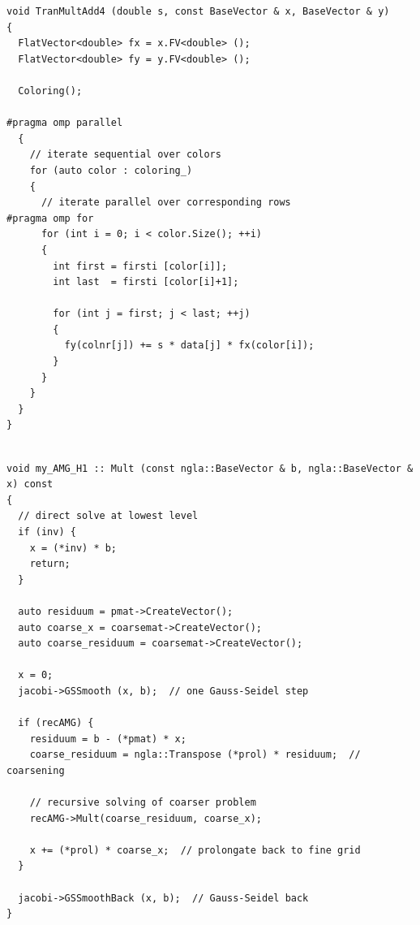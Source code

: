 \documentclass[a4paper,11pt]{scrartcl}
\begin{document}
\begin{lstlisting}
void TranMultAdd4 (double s, const BaseVector & x, BaseVector & y)
{
  FlatVector<double> fx = x.FV<double> ();
  FlatVector<double> fy = y.FV<double> ();

  Coloring();

#pragma omp parallel
  {
    // iterate sequential over colors
    for (auto color : coloring_)
    {
      // iterate parallel over corresponding rows
#pragma omp for
      for (int i = 0; i < color.Size(); ++i)
      {
        int first = firsti [color[i]];
        int last  = firsti [color[i]+1];

        for (int j = first; j < last; ++j)
        {
          fy(colnr[j]) += s * data[j] * fx(color[i]);
        }
      }
    }
  }
}


\end{lstlisting}

\begin{lstlisting}
void my_AMG_H1 :: Mult (const ngla::BaseVector & b, ngla::BaseVector & x) const
{
  // direct solve at lowest level
  if (inv) {
    x = (*inv) * b;
    return;
  }

  auto residuum = pmat->CreateVector();
  auto coarse_x = coarsemat->CreateVector();
  auto coarse_residuum = coarsemat->CreateVector();

  x = 0;
  jacobi->GSSmooth (x, b);  // one Gauss-Seidel step

  if (recAMG) {
    residuum = b - (*pmat) * x;
    coarse_residuum = ngla::Transpose (*prol) * residuum;  // coarsening

    // recursive solving of coarser problem
    recAMG->Mult(coarse_residuum, coarse_x);

    x += (*prol) * coarse_x;  // prolongate back to fine grid
  }

  jacobi->GSSmoothBack (x, b);  // Gauss-Seidel back
}
\end{lstlisting}
\end{document}
